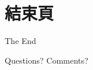 \documentclass[12pt, aspectratio=43]{beamer}
\begin{document}

\section*{結束頁}


\begin{frame}[plain] %
	\begin{center}
		{\Huge The End}
		
		\bigskip\bigskip 
		
		{\LARGE Questions? Comments?}
	\end{center}
\end{frame}

\end{document}
